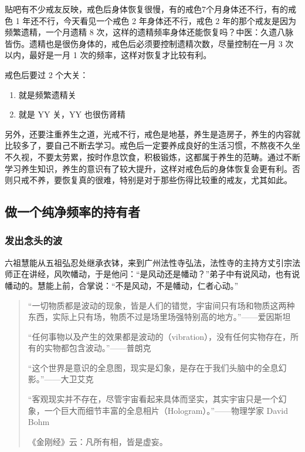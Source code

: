 \documentclass{ctexart}
\begin{document}
贴吧有不少戒友反映，戒色后身体恢复很慢，有的戒色7个月身体还不行，有的戒色 1 年还不行，今天看见一个戒色 2 年身体还不行，戒色 2 年的那个戒友是因为频繁遗精，一个月遗精 8 次，这样的遗精频率身体还能恢复吗？中医：久遗八脉皆伤。遗精也是很伤身体的，戒色后必须要控制遗精次数，尽量控制在一月 3 次以内，最好是一月 1 次的频率，这样对恢复才比较有利。

戒色后要过 2 个大关：

\begin{enumerate}
    \item 就是频繁遗精关
    \item 就是 YY 关，YY 也很伤肾精
\end{enumerate}

另外，还要注重养生之道，光戒不行，戒色是地基，养生是造房子，养生的内容就比较多了，要自己不断去学习。戒色后一定要养成良好的生活习惯，不熬夜不久坐不久视，不要太劳累，按时作息饮食，积极锻炼，这都属于养生的范畴。通过不断学习养生知识，养生的意识有了较大提升，这样对戒色后的身体恢复会更有利。否则只戒不养，要恢复真的很难，特别是对于那些伤得比较重的戒友，尤其如此。

\subsection{做一个纯净频率的持有者}

\subsubsection{发出念头的波}

六祖慧能从五祖弘忍处继承衣钵，来到广州法性寺弘法，法性寺的主持方丈引宗法师正在讲经，风吹幡动，于是他问：“是风动还是幡动？”弟子中有说风动，也有说幡动的。慧能上前，合掌说：“不是风动，不是幡动，仁者心动。”

\begin{quotation}
    “一切物质都是波动的现象，皆是人们的错觉，宇宙间只有场和物质这两种东西，实际上只有场，物质不过是场里场强特别高的地方。”\hfill ——爱因斯坦

    “任何事物以及产生的效果都是波动的（vibration），没有任何实物存在，所有的实物都包含波动。”\hfill ——普朗克

    “这个世界是意识的全息图，现实是幻象，是存在于我们头脑中的全息幻影。”\hfill ——大卫艾克

    “客观现实并不存在，尽管宇宙看起来具体而坚实，其实宇宙只是一个幻象，一个巨大而细节丰富的全息相片（Hologram）。”\hfill ——物理学家 David Bohm

    《金刚经》云：凡所有相，皆是虚妄。
\end{quotation}
\end{document}

